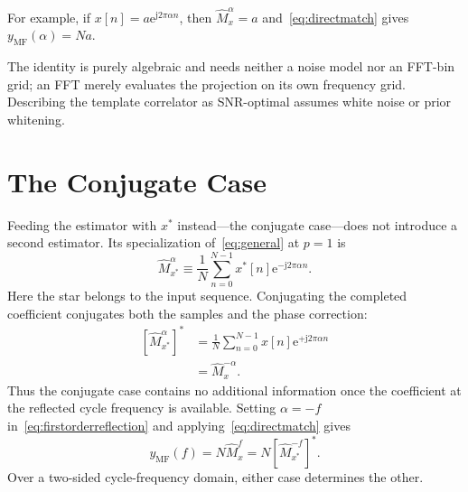 \documentclass[11pt,draftcls,onecolumn,journal]{IEEEtran}
\newcommand{\ee}{\mathrm{e}}
\newcommand{\jj}{\mathrm{j}}
\begin{document}
\begin{center}
\end{center}

For example, if $x[n]=a\ee^{\jj2\pi\alpha n}$, then $\widehat M_x^{\alpha}=a$ and~\eqref{eq:directmatch} gives $y_{\mathrm{MF}}(\alpha)=Na$.

The identity is purely algebraic and needs neither a noise model nor an FFT-bin grid; an FFT merely evaluates the projection on its own frequency grid.  Describing the template correlator as SNR-optimal assumes white noise or prior whitening.

\section*{The Conjugate Case}

Feeding the estimator with $x^*$ instead---the conjugate case---does not introduce a second estimator.  Its specialization of~\eqref{eq:general} at $p=1$ is
\begin{equation}
\widehat M_{x^*}^{\alpha}
\equiv\frac{1}{N}\sum_{n=0}^{N-1}
x^*[n]\ee^{-\jj2\pi\alpha n}.
\label{eq:conjugatemean}
\end{equation}
Here the star belongs to the input sequence.  Conjugating the completed coefficient conjugates both the samples and the phase correction:
\begin{equation}
\begin{aligned}
\left[\widehat M_{x^*}^{\alpha}\right]^*
&=\frac{1}{N}\sum_{n=0}^{N-1}
x[n]\ee^{+\jj2\pi\alpha n}\\
&=\widehat M_x^{-\alpha}.
\end{aligned}
\label{eq:firstorderreflection}
\end{equation}
Thus the conjugate case contains no additional information once the coefficient at the reflected cycle frequency is available.  Setting $\alpha=-f$ in~\eqref{eq:firstorderreflection} and applying~\eqref{eq:directmatch} gives
\begin{equation}
\boxed{
y_{\mathrm{MF}}(f)
=N\widehat M_x^f
=N\left[\widehat M_{x^*}^{-f}\right]^*
}.
\label{eq:conjugatematch}
\end{equation}
Over a two-sided cycle-frequency domain, either case determines the other.
\end{document}

